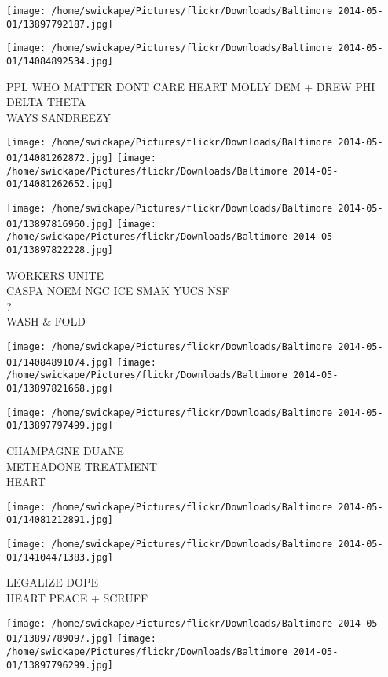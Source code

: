 \documentclass[10pt,letterpaper]{article}
\begin{document}
\texttt{[image: /home/swickape/Pictures/flickr/Downloads/Baltimore 2014-05-01/13897792187.jpg]}

\vspace{0.25in}
\texttt{[image: /home/swickape/Pictures/flickr/Downloads/Baltimore 2014-05-01/14084892534.jpg]}

PPL WHO MATTER DONT CARE HEART MOLLY DEM + DREW PHI DELTA THETA\\
WAYS SANDREEZY
\pagebreak

\texttt{[image: /home/swickape/Pictures/flickr/Downloads/Baltimore 2014-05-01/14081262872.jpg]}
\texttt{[image: /home/swickape/Pictures/flickr/Downloads/Baltimore 2014-05-01/14081262652.jpg]}

\texttt{[image: /home/swickape/Pictures/flickr/Downloads/Baltimore 2014-05-01/13897816960.jpg]}
\texttt{[image: /home/swickape/Pictures/flickr/Downloads/Baltimore 2014-05-01/13897822228.jpg]}

WORKERS UNITE\\
CASPA NOEM NGC ICE SMAK YUCS NSF\\
?\\
WASH \& FOLD
\pagebreak

\texttt{[image: /home/swickape/Pictures/flickr/Downloads/Baltimore 2014-05-01/14084891074.jpg]}
\texttt{[image: /home/swickape/Pictures/flickr/Downloads/Baltimore 2014-05-01/13897821668.jpg]}

\vspace{0.25in}
\texttt{[image: /home/swickape/Pictures/flickr/Downloads/Baltimore 2014-05-01/13897797499.jpg]}

CHAMPAGNE DUANE\\
METHADONE TREATMENT\\
HEART
\pagebreak

\texttt{[image: /home/swickape/Pictures/flickr/Downloads/Baltimore 2014-05-01/14081212891.jpg]}

\vspace{0.25in}
\texttt{[image: /home/swickape/Pictures/flickr/Downloads/Baltimore 2014-05-01/14104471383.jpg]}

LEGALIZE DOPE\\
HEART PEACE + SCRUFF
\pagebreak

\texttt{[image: /home/swickape/Pictures/flickr/Downloads/Baltimore 2014-05-01/13897789097.jpg]}
\texttt{[image: /home/swickape/Pictures/flickr/Downloads/Baltimore 2014-05-01/13897796299.jpg]}
\end{document}
